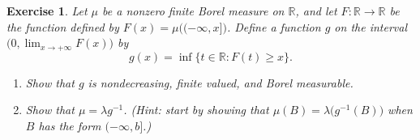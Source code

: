 \documentclass[11pt,a4paper,twoside]{article}
\newtheorem{exercise}{Exercise}
\begin{document}
\begin{exercise}
Let $\mu$ be a nonzero finite Borel measure on $\mathbb{R}$, and let
$F:\mathbb{R}\to\mathbb{R}$ be the function defined by
$F(x)=\mu\big((-\infty,x]\big)$. Define a function $g$ on the interval
  $\big(0,\lim_{x\to+\infty}F(x)\big)$ by
  \begin{equation*}
    g(x)=\inf\{t\in\mathbb{R}:F(t)\geq x\}.
  \end{equation*}
  \begin{enumerate}
    \item Show that $g$ is nondecreasing, finite valued, and Borel
      measurable.
    \item Show that $\mu=\lambda g^{-1}$. (Hint: start by showing that
      $\mu(B)=\lambda\big(g^{-1}(B)\big)$ when $B$ has the form $(-\infty,b]$.)
  \end{enumerate}
\end{exercise}
\end{document}
